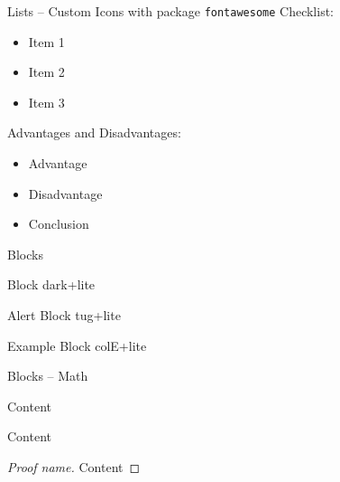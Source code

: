 \documentclass[table,aspectratio=43]{beamer}
\begin{document}
\newcommand{\checkyes}{\textcolor{tuggreen}{\faCheckSquareO}}
\newcommand{\checkno}{\textcolor{black}{\faSquareO\,}}
\begin{frame}[fragile]{Lists -- Custom Icons with package \texttt{fontawesome}}
  Checklist:
  \begin{itemize}
    \item[\checkyes] Item 1
    \item[\checkyes] Item 2
    \item[\checkno] Item 3
  \end{itemize}
  Advantages and Disadvantages:
  \begin{itemize}
    \item[\textcolor{tuggreen}{\faPlusCircle}] Advantage
    \item[\textcolor{tugred}{\faMinusCircle}]  Disadvantage
    \item[\textcolor{tugblue}{\faArrowCircleRight}] Conclusion
  \end{itemize}
\end{frame}

\begin{frame}{Blocks}
  \begin{block}{Block}
    dark+lite
  \end{block}
  \begin{alertblock}{Alert Block}
    tug+lite
  \end{alertblock}
  \begin{exampleblock}{Example Block}
    colE+lite
  \end{exampleblock}
\end{frame}

\begin{frame}{Blocks -- Math}
  \begin{theorem}
    Content
  \end{theorem}
  \begin{example}
    Content
  \end{example}
  \begin{proof}[Proof name]
    Content
  \end{proof}
\end{frame}
\end{document}
